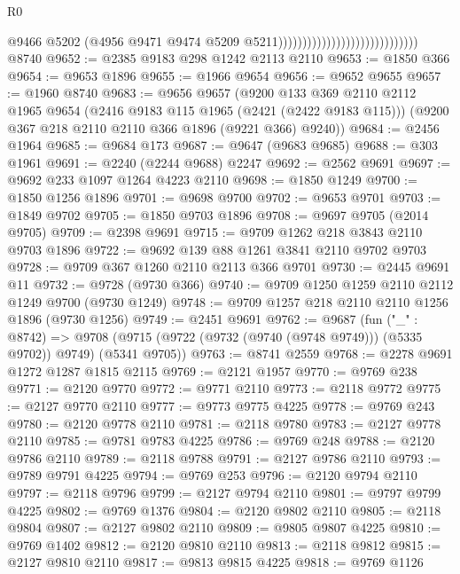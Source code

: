 \begin{lexlean}{R0}
\begin{coremodule}
                                                            @9466
                                                            @5202
                                                            (@4956
                                                              @9471
                                                              @9474
                                                              @5209
                                                              @5211)))))))))))))))))))))))))))))
    @8740
@9652 := @2385 @9183 @298 @1242 @2113 @2110
@9653 := @1850 @366
@9654 := @9653 @1896
@9655 := @1966 @9654
@9656 := @9652 @9655
@9657 := @1960 @8740
@9683 := @9656
    @9657
    (@9200
      @133
      @369
      @2110
      @2112
      @1965
      @9654
      (@2416 @9183 @115 @1965 (@2421 (@2422 @9183 @115)))
      (@9200 @367 @218 @2110 @2110 @366 @1896 (@9221 @366) @9240))
@9684 := @2456 @1964
@9685 := @9684 @173
@9687 := @9647 (@9683 @9685)
@9688 := @303 @1961
@9691 := @2240 (@2244 @9688) @2247
@9692 := @2562 @9691
@9697 := @9692 @233 @1097 @1264 @4223 @2110
@9698 := @1850 @1249
@9700 := @1850 @1256 @1896
@9701 := @9698 @9700
@9702 := @9653 @9701
@9703 := @1849 @9702
@9705 := @1850 @9703 @1896
@9708 := @9697 @9705 (@2014 @9705)
@9709 := @2398 @9691
@9715 := @9709 @1262 @218 @3843 @2110 @9703 @1896
@9722 := @9692 @139 @88 @1261 @3841 @2110 @9702 @9703
@9728 := @9709 @367 @1260 @2110 @2113 @366 @9701
@9730 := @2445 @9691 @11
@9732 := @9728 (@9730 @366)
@9740 := @9709 @1250 @1259 @2110 @2112 @1249 @9700 (@9730 @1249)
@9748 := @9709 @1257 @218 @2110 @2110 @1256 @1896 (@9730 @1256)
@9749 := @2451 @9691
@9762 := @9687
    (fun ("_" : @8742) =>
    @9708 (@9715 (@9722 (@9732 (@9740 (@9748 @9749))) (@5335 @9702)) @9749) (@5341 @9705))
@9763 := @8741 @2559
@9768 := @2278 @9691 @1272 @1287 @1815 @2115
@9769 := @2121 @1957
@9770 := @9769 @238
@9771 := @2120 @9770
@9772 := @9771 @2110
@9773 := @2118 @9772
@9775 := @2127 @9770 @2110
@9777 := @9773 @9775 @4225
@9778 := @9769 @243
@9780 := @2120 @9778 @2110
@9781 := @2118 @9780
@9783 := @2127 @9778 @2110
@9785 := @9781 @9783 @4225
@9786 := @9769 @248
@9788 := @2120 @9786 @2110
@9789 := @2118 @9788
@9791 := @2127 @9786 @2110
@9793 := @9789 @9791 @4225
@9794 := @9769 @253
@9796 := @2120 @9794 @2110
@9797 := @2118 @9796
@9799 := @2127 @9794 @2110
@9801 := @9797 @9799 @4225
@9802 := @9769 @1376
@9804 := @2120 @9802 @2110
@9805 := @2118 @9804
@9807 := @2127 @9802 @2110
@9809 := @9805 @9807 @4225
@9810 := @9769 @1402
@9812 := @2120 @9810 @2110
@9813 := @2118 @9812
@9815 := @2127 @9810 @2110
@9817 := @9813 @9815 @4225
@9818 := @9769 @1126

\end{coremodule}
\end{lexlean}

